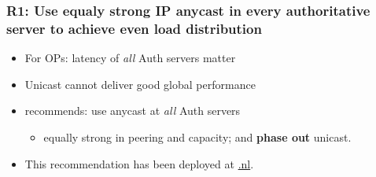 \documentclass[11pt,show 
notes,notheorems,noamsthm,blank]{beamer} %
\begin{document}
\begin{frame}
 \frametitle{R1: Use equaly strong IP anycast in every authoritative server to
    achieve even load distribution}
    
    
    
\begin{figure}
\centering

  
  \label{fig:nl-deployment}

\end{figure}
\vspace{-0.5cm}
\begin{itemize}
 \item For OPs: latency of \textit{all} Auth servers matter 
  \item Unicast cannot deliver good global performance 
  \item \cite{Mueller17b} recommends: use anycast at \textit{all} Auth servers
\begin{itemize}
 \item equally strong in peering and capacity; and \textbf{phase out} unicast.
\end{itemize}

\item This recommendation has been deployed at \url{.nl}.
\end{itemize}


\end{frame}
\end{document}
